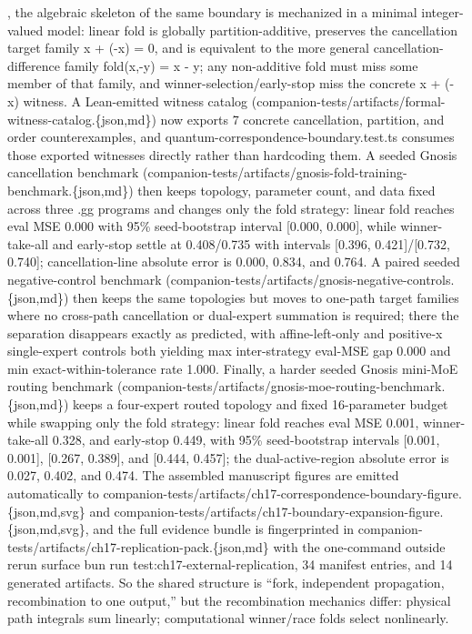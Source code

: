 \documentclass[
]{article}
\begin{document}
, the algebraic skeleton of the same boundary is mechanized in a minimal
integer-valued model: linear fold is globally partition-additive,
preserves the cancellation target family x + (-x) = 0, and is equivalent
to the more general cancellation-difference family fold(x,-y) = x - y;
any non-additive fold must miss some member of that family, and
winner-selection/early-stop miss the concrete x + (-x) witness. A
Lean-emitted witness catalog
(companion-tests/artifacts/formal-witness-catalog.\{json,md\}) now
exports 7 concrete cancellation, partition, and order counterexamples,
and quantum-correspondence-boundary.test.ts consumes those exported
witnesses directly rather than hardcoding them. A seeded Gnosis
cancellation benchmark
(companion-tests/artifacts/gnosis-fold-training-benchmark.\{json,md\})
then keeps topology, parameter count, and data fixed across three .gg
programs and changes only the fold strategy: linear fold reaches eval
MSE 0.000 with 95\% seed-bootstrap interval {[}0.000, 0.000{]}, while
winner-take-all and early-stop settle at 0.408/0.735 with intervals
{[}0.396, 0.421{]}/{[}0.732, 0.740{]}; cancellation-line absolute error
is 0.000, 0.834, and 0.764. A paired seeded negative-control benchmark
(companion-tests/artifacts/gnosis-negative-controls.\{json,md\}) then
keeps the same topologies but moves to one-path target families where no
cross-path cancellation or dual-expert summation is required; there the
separation disappears exactly as predicted, with affine-left-only and
positive-x single-expert controls both yielding max inter-strategy
eval-MSE gap 0.000 and min exact-within-tolerance rate 1.000. Finally, a
harder seeded Gnosis mini-MoE routing benchmark
(companion-tests/artifacts/gnosis-moe-routing-benchmark.\{json,md\})
keeps a four-expert routed topology and fixed 16-parameter budget while
swapping only the fold strategy: linear fold reaches eval MSE 0.001,
winner-take-all 0.328, and early-stop 0.449, with 95\% seed-bootstrap
intervals {[}0.001, 0.001{]}, {[}0.267, 0.389{]}, and {[}0.444,
0.457{]}; the dual-active-region absolute error is 0.027, 0.402, and
0.474. The assembled manuscript figures are emitted automatically to
companion-tests/artifacts/ch17-correspondence-boundary-figure.\{json,md,svg\}
and
companion-tests/artifacts/ch17-boundary-expansion-figure.\{json,md,svg\},
and the full evidence bundle is fingerprinted in
companion-tests/artifacts/ch17-replication-pack.\{json,md\} with the
one-command outside rerun surface bun run
test:ch17-external-replication, 34 manifest entries, and 14 generated
artifacts. So the shared structure is ``fork, independent propagation,
recombination to one output,'' but the recombination mechanics differ:
physical path integrals sum linearly; computational winner/race folds
select nonlinearly.
\end{document}
